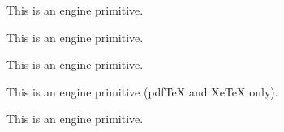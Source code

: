 \begin{function}[]
  {
    \tracingparagraphs
  }
  \begin{syntax}
  \end{syntax}
  This is an engine primitive.
\end{function}



\begin{function}[]
  {
    \tracingrestores
  }
  \begin{syntax}
  \end{syntax}
  This is an engine primitive.
\end{function}



\begin{function}[]
  {
    \tracingscantokens
  }
  \begin{syntax}
  \end{syntax}
  This is an engine primitive.
\end{function}



\begin{function}[]
  {
    \tracingstacklevels
  }
  \begin{syntax}
  \end{syntax}
  This is an engine primitive (pdf\TeX{} and Xe\TeX{} only).
\end{function}



\begin{function}[]
  {
    \tracingstats
  }
  \begin{syntax}
  \end{syntax}
  This is an engine primitive.
\end{function}



\begin{function}[]
  {
    \try@simple@size
  }
  \begin{syntax}
  \end{syntax}

\end{function}



\begin{function}[]
  {
    \ttdef@ult
  }
  \begin{syntax}
  \end{syntax}

\end{function}



